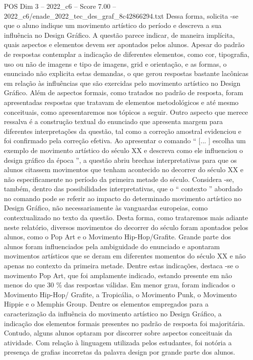 \begin{textsample}{POS Dim 3 – 2022\_c6 – Score 7.00 – 2022\_c6/enade\_2022\_tec\_des\_graf\_8c42866294.txt}
Dessa forma, solicita -se que o aluno indique um movimento artístico do período e descreva a sua influência no Design Gráfico.
A questão parece indicar, de maneira implícita, quais aspectos e elementos devem ser apontados pelos alunos.
Apesar do padrão de respostas contemplar a indicação de diferentes elementos, como cor, tipografia, uso ou não de imagens e tipo de imagens, grid e orientação, e as formas, o enunciado não explicita estas demandas, o que gerou respostas bastante lacônicas em relação às influências que são exercidas pelo movimento artístico no Design Gráfico.
Além de aspectos formais, como tratados no padrão de resposta, foram apresentadas respostas que tratavam de elementos metodológicos e até mesmo conceituais, como apresentaremos nos tópicos a seguir.
Outro aspecto que merece ressalva é a construção textual do enunciado que apresenta margem para diferentes interpretações da questão, tal como a correção amostral evidenciou e foi confirmado pela correção efetiva.
Ao apresentar o comando “ [... ] escolha um exemplo de movimento artístico do século XX e descreva como ele influenciou o design gráfico da época ”, a questão abriu brechas interpretativas para que os alunos citassem movimentos que tenham acontecido no decorrer do século XX e não especificamente no período da primeira metade do século.
Considera -se, também, dentro das possibilidades interpretativas, que o “ contexto ” abordado no comando pode se referir ao impacto do determinado movimento artístico no Design Gráfico, não necessariamente às vanguardas europeias, como contextualizado no texto da questão.
Desta forma, como trataremos mais adiante neste relatório, diversos movimentos do decorrer do século foram apontados pelos alunos, como o Pop Art e o Movimento Hip-Hop/Grafite.
Grande parte dos alunos foram influenciados pela ambiguidade do enunciado e apontaram movimentos artísticos que se deram em diferentes momentos do século XX e não apenas no contexto da primeira metade.
Dentre estas indicações, destaca -se o movimento Pop Art, que foi amplamente indicado, estando presente em não menos do que 30 \% das respostas válidas.
Em menor grau, foram indicados o Movimento Hip-Hop/ Grafite, a Tropicália, o Movimento Punk, o Movimento Hippie e o Memphis Group.
Dentre os elementos empregados para a caracterização da influência do movimento artístico no Design Gráfico, a indicação dos elementos formais presentes no padrão de resposta foi majoritária.
Contudo, alguns alunos optaram por discorrer sobre aspectos conceituais da atividade.
Com relação à linguagem utilizada pelos estudantes, foi notória a presença de grafias incorretas da palavra design por grande parte dos alunos.

\end{textsample}

